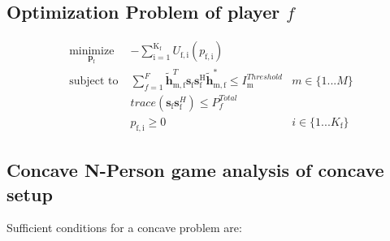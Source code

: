 \documentclass[12pt,a4paper]{report}
\begin{document}
\subsection{Optimization Problem of player $f$}


	\begin{subequations}
	\label{optim}
	\begin{align}
	    \underset{\mathbf{p}_{\mathrm{f}} }{\text{minimize}} \;
	    & - \sum_{\mathrm{i=1}}^{\mathrm{K_f}}
    	U_{\mathrm{f,i}}(p_{\mathrm{f,i}}) \label{player_opt_c} \\
	    \text{subject to} \; &
	  \sum^F_{f=1} \mathbf{\tilde{h}}_{\mathrm{m,f}}^T  \mathbf{s}_{\mathrm{f}} 						
	\mathbf{s_{\mathrm{f}}^{\mathrm{H}}} \mathbf{\tilde{h}_{\mathrm{m,f}}^*} \leq I^{Threshold}		
	_{\mathrm{m}} & m \in \{1 ...M\} 
		\label{interference_const_c}\\
        & trace(\mathbf{s}_\mathrm{f}\mathbf{s}_\mathrm{f}^H)  \leq P^{Total}_{f}  \label{power_const_c}\\
        & p_{\mathrm{f,i}} \geq 0 &  i \in \{1 ...K_{\mathrm{f}}\} \label{pos_power_const_c}
	\end{align}
	\end{subequations}


\subsection{Concave N-Person game analysis of concave setup}

Sufficient conditions for a concave problem are:
\end{document}
